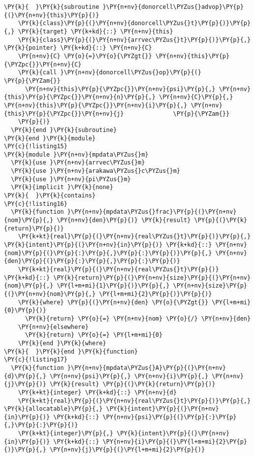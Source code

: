 \begin{Verbatim}[commandchars=\\\{\}]
\PY{k}{  }\PY{k}{subroutine }\PY{n+nv}{donorcell\PYZus{}advop}\PY{p}{(}\PY{n+nv}{this}\PY{p}{)}
    \PY{k}{class}\PY{p}{(}\PY{n+nv}{donorcell\PYZus{}t}\PY{p}{)}\PY{p}{,} \PY{k}{target} \PY{k+kd}{::} \PY{n+nv}{this}
    \PY{k}{class}\PY{p}{(}\PY{n+nv}{arrvec\PYZus{}t}\PY{p}{)}\PY{p}{,} \PY{k}{pointer} \PY{k+kd}{::} \PY{n+nv}{C}
    \PY{n+nv}{C} \PY{o}{=}\PY{o}{\PYZgt{}} \PY{n+nv}{this}\PY{p}{\PYZpc{}}\PY{n+nv}{C}
    \PY{k}{call }\PY{n+nv}{donorcell\PYZus{}op}\PY{p}{(}                                 \PY{p}{\PYZam{}}
      \PY{n+nv}{this}\PY{p}{\PYZpc{}}\PY{n+nv}{psi}\PY{p}{,} \PY{n+nv}{this}\PY{p}{\PYZpc{}}\PY{n+nv}{n}\PY{p}{,} \PY{n+nv}{C}\PY{p}{,} \PY{n+nv}{this}\PY{p}{\PYZpc{}}\PY{n+nv}{i}\PY{p}{,} \PY{n+nv}{this}\PY{p}{\PYZpc{}}\PY{n+nv}{j}              \PY{p}{\PYZam{}}
    \PY{p}{)}
  \PY{k}{end }\PY{k}{subroutine}
\PY{k}{end }\PY{k}{module}
\PY{c}{!listing15}
\PY{k}{module }\PY{n+nv}{mpdata\PYZus{}m}
  \PY{k}{use }\PY{n+nv}{arrvec\PYZus{}m}
  \PY{k}{use }\PY{n+nv}{arakawa\PYZus{}c\PYZus{}m}
  \PY{k}{use }\PY{n+nv}{pi\PYZus{}m}
  \PY{k}{implicit }\PY{k}{none}
\PY{k}{  }\PY{k}{contains} 
\PY{c}{!listing16}
  \PY{k}{function }\PY{n+nv}{mpdata\PYZus{}frac}\PY{p}{(}\PY{n+nv}{nom}\PY{p}{,} \PY{n+nv}{den}\PY{p}{)} \PY{k}{result} \PY{p}{(}\PY{k}{return}\PY{p}{)}
    \PY{k+kt}{real}\PY{p}{(}\PY{n+nv}{real\PYZus{}t}\PY{p}{)}\PY{p}{,} \PY{k}{intent}\PY{p}{(}\PY{n+nv}{in}\PY{p}{)} \PY{k+kd}{::} \PY{n+nv}{nom}\PY{p}{(}\PY{p}{:}\PY{p}{,}\PY{p}{:}\PY{p}{)}\PY{p}{,} \PY{n+nv}{den}\PY{p}{(}\PY{p}{:}\PY{p}{,}\PY{p}{:}\PY{p}{)}
    \PY{k+kt}{real}\PY{p}{(}\PY{n+nv}{real\PYZus{}t}\PY{p}{)} \PY{k+kd}{::} \PY{k}{return}\PY{p}{(}\PY{n+nv}{size}\PY{p}{(}\PY{n+nv}{nom}\PY{p}{,} \PY{l+m+mi}{1}\PY{p}{)}\PY{p}{,} \PY{n+nv}{size}\PY{p}{(}\PY{n+nv}{nom}\PY{p}{,} \PY{l+m+mi}{2}\PY{p}{)}\PY{p}{)}
    \PY{k}{where} \PY{p}{(}\PY{n+nv}{den} \PY{o}{\PYZgt{}} \PY{l+m+mi}{0}\PY{p}{)}
      \PY{k}{return} \PY{o}{=} \PY{n+nv}{nom} \PY{o}{/} \PY{n+nv}{den}
    \PY{n+nv}{elsewhere}
      \PY{k}{return} \PY{o}{=} \PY{l+m+mi}{0}
    \PY{k}{end }\PY{k}{where}
\PY{k}{  }\PY{k}{end }\PY{k}{function}
\PY{c}{!listing17}
  \PY{k}{function }\PY{n+nv}{mpdata\PYZus{}A}\PY{p}{(}\PY{n+nv}{d}\PY{p}{,} \PY{n+nv}{psi}\PY{p}{,} \PY{n+nv}{i}\PY{p}{,} \PY{n+nv}{j}\PY{p}{)} \PY{k}{result} \PY{p}{(}\PY{k}{return}\PY{p}{)}
    \PY{k+kt}{integer} \PY{k+kd}{::} \PY{n+nv}{d}
    \PY{k+kt}{real}\PY{p}{(}\PY{n+nv}{real\PYZus{}t}\PY{p}{)}\PY{p}{,} \PY{k}{allocatable}\PY{p}{,} \PY{k}{intent}\PY{p}{(}\PY{n+nv}{in}\PY{p}{)} \PY{k+kd}{::} \PY{n+nv}{psi}\PY{p}{(}\PY{p}{:}\PY{p}{,}\PY{p}{:}\PY{p}{)}
    \PY{k+kt}{integer}\PY{p}{,} \PY{k}{intent}\PY{p}{(}\PY{n+nv}{in}\PY{p}{)} \PY{k+kd}{::} \PY{n+nv}{i}\PY{p}{(}\PY{l+m+mi}{2}\PY{p}{)}\PY{p}{,} \PY{n+nv}{j}\PY{p}{(}\PY{l+m+mi}{2}\PY{p}{)}

\end{Verbatim}
